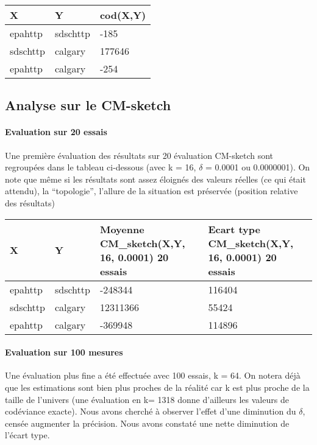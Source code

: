\documentclass[a4paper,11pt]{article}%
\begin{document}
\begin{tabularx}{\textwidth}{|l|l|X|}
      \hline X & Y & cod(X,Y) \\ \hline
      epahttp & sdschttp & -185 \\ \hline
      sdschttp & calgary & 177646 \\ \hline
      epahttp & calgary & -254  \\ \hline
\end{tabularx}

\subsection{Analyse sur le CM-sketch}

\paragraph{Evaluation sur 20 essais}Une première évaluation des résultats sur 20 évaluation CM-sketch sont regroupées dans le tableau ci-dessous 
(avec k = 16, $\delta$ = 0.0001 ou 0.0000001).\newline
On note que même si les résultats sont assez éloignés des valeurs réelles (ce qui était attendu), la ``topologie'',  l'allure de la situation est préservée (position relative des résultats)

\begin{tabularx}{\textwidth}{|l|l|X|X|}
      \hline X & Y & Moyenne CM\_sketch(X,Y, 16, 0.0001) 20 essais & Ecart type CM\_sketch(X,Y, 16, 0.0001) 20 essais \\ \hline
      epahttp & sdschttp & -248344 & 116404 \\ \hline
      sdschttp & calgary & 12311366 & 55424 \\ \hline
      epahttp & calgary & -369948  & 114896 \\ \hline
\end{tabularx}

\paragraph{Evaluation sur 100 mesures}Une évaluation plus fine a été effectuée avec 100 essais, k = 64. On notera déjà que les estimations sont bien plus 
proches de la réalité car k est plus proche de la taille de l'univers
(une évaluation en k= 1318 donne d'ailleurs les valeurs de codéviance exacte). Nous avons cherché à observer l'effet d'une diminution du $\delta$, 
censée augmenter la précision. Nous avons constaté une nette diminution de l'écart type.
\end{document}

